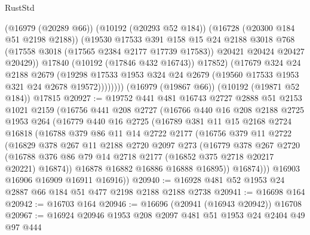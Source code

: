 \begin{lexlean}{RustStd}
\begin{coremodule}
                  (@16979 (@20289 @66))
                  (@10192 (@20293 @52 @184))
                  (@16728 (@20300 @184 @51 @2198 @2188))
                  (@19530
                    @17533
                    @391
                    @158
                    @15
                    @24
                    @2188
                    @3018
                    @768
                    (@17558 @3018 (@17565 @2384 @2177 @17739 @17583))
                    @20421
                    @20424
                    @20427
                    @20429))
                @17840
                (@10192 (@17846 @432 @16743))
                @17852)
              (@17679
                @324
                @24
                @2188
                @2679
                (@19298
                  @17533
                  @1953
                  @324
                  @24
                  @2679
                  (@19560 @17533 @1953 @321 @24 @2678 @19572))))))))
    (@16979 (@19867 @66))
    (@10192 (@19871 @52 @184))
    @17815
@20927 := @19752
    @441
    @481
    @16743
    @2727
    @2888
    @51
    @2153
    @1021
    @2159
    (@16756
      @441
      @208
      @2727
      (@16766
        @440
        @16
        @208
        @2188
        @2725
        @1953
        @264
        (@16779
          @440
          @16
          @2725
          (@16789
            @381
            @11
            @15
            @2168
            @2724
            @16818
            (@16788
              @379
              @86
              @11
              @14
              @2722
              @2177
              (@16756
                @379
                @11
                @2722
                (@16829
                  @378
                  @267
                  @11
                  @2188
                  @2720
                  @2097
                  @273
                  (@16779
                    @378
                    @267
                    @2720
                    (@16788 @376 @86 @79 @14 @2718 @2177 (@16852 @375 @2718 @20217 @20221) @16874))
                  @16878
                  @16882
                  @16886
                  @16888
                  @16895))
              @16874)))
        @16903
        @16906
        @16909
        @16911
        @16916))
@20940 := @16928 @481 @52 @1953 @24 @2887 @66 @184 @51 @477 @2198 @2188 @2188 @2738
@20941 := @16698 @164
@20942 := @16703 @164
@20946 := @16696 (@20941 (@16943 @20942)) @16708
@20967 := @16924
    @20946
    @1953
    @208
    @2097
    @481
    @51
    @1953
    @24
    @2404
    @49
    @97
    @444

\end{coremodule}
\end{lexlean}
